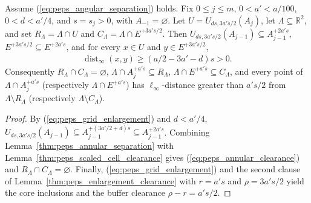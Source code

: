 \begin{lemma}
    \label{thm:peps_annular_cell_clearance}
    \leanok
    Assume (\ref{eq:peps_angular_separation}) holds. Fix $0\le j\le m$,
    $0<a'<a/100$, $0<d<a'/4$, and $s=s_j>0$, with $A_{-1}=\varnothing$. Let
    $U=U_{ds,3a's/2}(A_j)$, let $\Lambda\subseteq\mathbb R^2$, and set
    $R_\Lambda=\Lambda\cap U$ and $C_\Lambda=\Lambda\cap E^{+3a's/2}$. Then
    $U_{ds,3a's/2}(A_{j-1})\subseteq A_{j-1}^{+2a's}$,
    $E^{+3a's/2}\subseteq E^{+2a's}$, and for every $x\in U$ and
    $y\in E^{+3a's/2}$,
    \begin{align}
        \operatorname{dist}_{\infty}(x,y)\ge(a/2-3a'-d)s>0.
        \label{eq:peps_annular_clearance}
    \end{align}
    Consequently $R_\Lambda\cap C_\Lambda=\varnothing$,
    $\Lambda\cap A_j^{+a's}\subseteq R_\Lambda$,
    $\Lambda\cap E^{+a's}\subseteq C_\Lambda$, and every point of
    $\Lambda\cap A_j^{+a's}$ (respectively $\Lambda\cap E^{+a's}$) has
    $\ell_\infty$-distance greater than $a's/2$ from $\Lambda\setminus R_\Lambda$
    (respectively $\Lambda\setminus C_\Lambda$).
\end{lemma}
\begin{proof}
    \leanok
    By (\ref{eq:peps_grid_enlargement}) and $d<a'/4$,
    $U_{ds,3a's/2}(A_{j-1})\subseteq A_{j-1}^{+(3a'/2+d)s}\subseteq A_{j-1}^{+2a's}$.
    Combining Lemma~\ref{thm:peps_annular_separation} with
    Lemma~\ref{thm:peps_scaled_cell_clearance} gives
    (\ref{eq:peps_annular_clearance}) and $R_\Lambda\cap C_\Lambda=\varnothing$.
    Finally, (\ref{eq:peps_grid_enlargement}) and the second clause of
    Lemma~\ref{thm:peps_enlargement_clearance} with $r=a's$ and $\rho=3a's/2$
    yield the core inclusions and the buffer clearance $\rho-r=a's/2$.
\end{proof}

